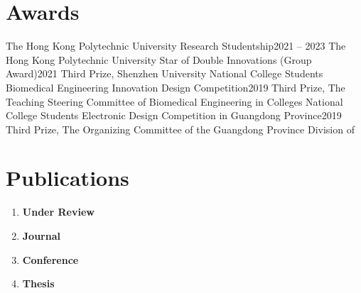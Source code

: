 \documentclass[letterpaper,11pt]{article}
\begin{document}
    \section{Awards}

    \resumeSubHeadingListStart
        \resumeSubheading
            {The Hong Kong Polytechnic University Research Studentship}{2021 -- 2023}
            {The Hong Kong Polytechnic University}{}
        \resumeSubheading
            {Star of Double Innovations (Group Award)}{2021}
            {Third Prize, Shenzhen University}{}
        \resumeSubheading
            {National College Students Biomedical Engineering Innovation Design Competition}{2019}
            {Third Prize, The Teaching Steering Committee of Biomedical Engineering in Colleges}{}
        \resumeSubheading
            {National College Students Electronic Design Competition in Guangdong Province}{2019}
            {Third Prize, The Organizing Committee of the Guangdong Province Division of }{}
    \resumeSubHeadingListEnd

    \section{Publications}
    
    \begin{refsection}
        \begin{enumerate}[leftmargin=0.15in, label={}, itemsep=0em]
            \item \textbf{Under Review}
            \nocite{*}
            \printbibliography[keyword=review, heading=none]
            \item \textbf{Journal}
            \nocite{*}
            \printbibliography[type=article, notkeyword=review, heading=none]
            \item \textbf{Conference}
            \nocite{*}
            \printbibliography[type=inproceedings, notkeyword=review, heading=none]
            \item \textbf{Thesis}
            \nocite{*}
            \printbibliography[type=thesis, notkeyword=review, heading=none]
            \printbibliography[type=phdthesis, notkeyword=review, heading=none]
        \end{enumerate}
    \end{refsection}
\end{document}
